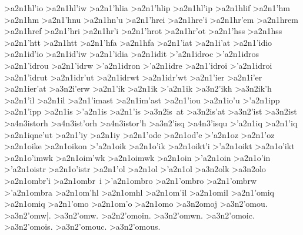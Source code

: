 {>a2n1hl'io
>a2n1hl'iw
>a2n1'hlia
>a2n1'hlip		%
>a2n1hl'ip
>a2n1hlif    		%
>a2n1'hm    		%
>a2n1hm
>a2n1'hnu   		%
>a2n1hn'u
>a2n1'hrei  		%
>a2n1hre'i
>a2n1hr'em  		%
>a2n1hrem
>a2n1href   		%
>a2n1'hri   		%
>a2n1hr'i
>a2n1'hrot  		%
>a2n1hr'ot
>a2n1'hss   		%
>a2n1hss
>a2n1'htt   		%
>a2n1htt
>a2n1'hfa  		%
>a2n1hfa
>a2n1'iat   		%
>a2n1i'at
>a2n1'idio    		%
>a2n1id'io
>a2n1id'iw
>a2n1'idia
>a2n1idit    		%
>'a2n1idroc 		%
>'a2n1idros
>a2n1'idrou
>a2n1'idrw
>'a2n1idron
>'a2n1idre
>a2n1'idroi
>'a2n1idroi
>a2n1'idrut		%
>a2n1idr'ut
>a2n1idrwt		%
>a2n1idr'wt   	 	%
>a2n1'ier   		%
>a2n1i'er
>a2n1ier'at 		%
	>a3n2i'erw 		%
>a2n1'ik    		%
>a2n1ik
>'a2n1ik    		%
	>a3n2'ikh  		%
	>a3n2ik'h
>a2n1'il    		%
>a2n1il
>a2n1'imast 		%
>a2n1im'ast
>a2n1'iou   		%
>a2n1io'u
>'a2n1ipp   		%
>a2n1'ipp
>a2n1is     		%
>'a2n1is    		%
>a2n1'is
	>a3n2is~at  		%
	>a3n2is'at
	>a3n2'ist   		%
	>a3n2ist
		>a4n3istorh 		%
		>a4n3ist'orh 		%
		>a4n3istor'h
	>a3n2'isq   		%
		>a4n3'isqu 		%
>'a2n1iq     	   	%
>a2n1'iq	
>a2n1iqne'ut 		%
>a2n1'iy    		%
>a2n1iy
>a2n1'ode   		%
>a2n1od'e
>'a2n1oz    		%
>a2n1'oz
>a2n1oike		%
>a2n1oikon  		%
>'a2n1oik   		%
>a2n1o'ik
>a2n1oikt'i  		%
>'a2n1oikt  		%
>a2n1o'ikt
>a2n1o'imwk 		%
>a2n1oim'wk
>a2n1oimwk  		%
>a2n1oin    		%
>'a2n1oin   		%
>a2n1o'in
>'a2n1oistr 		%
>a2n1o'istr
>a2n1'ol    		%
>a2n1ol
>'a2n1ol    		%
	>a3n2olk  		%
	>a3n2olo  		%
>a2n1ombr'i 		%
>a2n1ombr~i
>'a2n1ombro		%
>a2n1'ombro
>a2n1'ombrw
>'a2n1ombra
>a2n1om'hl  		%
>a2n1omhl
>a2n1om'il 		%
>a2n1omil
>a2n1'omiq 		%
>a2n1omiq
>a2n1'omo		%
>a2n1om'o
>a2n1omo    		%
	>a3n2omoj 		%
	>a3n2'omou. 		%
	>a3n2'omw|.
	>a3n2'omw.
	>a2n2'omoin.
	>a3n2'omwn.
	>a3n2'omoic.
	>a3n2'omois.
	>a3n2'omouc.
	>a3n2'omous.
}
